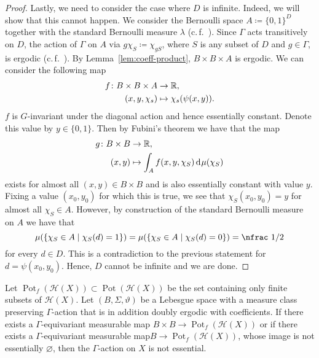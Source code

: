 \begin{proof}
  Lastly, we need to consider the case where \(D\) is infinite. Indeed, we will show that this cannot happen. We consider the Bernoulli space \(A \coloneqq \{0,1\}^D\) together with the standard Bernoulli measure \(\lambda\) (c.\,f.~\cite[29]{Klenke}). Since \(\Gamma\) acts transitively on \(D\), the action of \(\Gamma\) on \(A\) via \(g\chi_S \coloneqq \chi_{gS}\), where \(S\) is any subset of \(D\) and \(g \in \Gamma\), is ergodic (c.\,f.~\cite[Example~20.26]{Klenke}).
  By Lemma~\ref{lem:coeff-product}, \(B \times B \times A\) is ergodic. We can consider the following map
  \begin{align*}
    f\colon B \times B \times A & \to \mathbb{R},\\
    (x,y,\chi_s) & \mapsto \chi_s(\psi(x,y)).
  \end{align*}
  \(f\) is \(G\)-invariant under the diagonal action and hence essentially constant. Denote this value by \(y \in \{0,1\}\). Then by Fubini's theorem we have that the map
  \begin{align*}
    g\colon B \times B & \to \R,\\
    (x,y) & \mapsto \int_A f(x,y,\chi_S) \d\mu(\chi_S)
  \end{align*}
  exists for almost all \((x,y) \in B \times B\) and is also essentially constant with value \(y\). Fixing a value \((x_0, y_0)\) for which this is true, we see that \(\chi_S(x_0,y_0) = y\) for almost all \(\chi_S \in A\). However, by construction of the standard Bernoulli measure on \(A\) we have that
  \[
    \mu(\{\chi_S \in A \mid \chi_S(d) = 1 \}) = \mu(\{\chi_S \in A \mid \chi_S(d) = 0\}) = \text{\nfrac 1/2}
  \]
  for every \(d \in D\). This is a contradiction to the previous statement for \(d = \psi(x_0, y_0)\). Hence, \(D\) cannot be infinite and we are done.
\end{proof}

\begin{cor}[{\cite[Cor. 4.5]{MR3509968}}]
  \label{cor:4.5}
  Let \(\operatorname{Pot}_f(\mathcal{H}(X)) \subset \operatorname{Pot}(\mathcal{H}(X))\) be the set containing only finite subsets of \(\mathcal{H}(X)\). Let \((B, \Sigma, \vartheta)\) be a Lebesgue space with a measure class preserving \(\Gamma\)-action that is in addition doubly ergodic with coefficients. If there exists a \(\Gamma\)-equivariant measurable map \(B \times B \to \operatorname{Pot}_f(\mathcal{H}(X))\) or if there exists a \(\Gamma\)-equivariant measurable map\(B \to \operatorname{Pot}_f(\mathcal{H}(X))\), whose image is not essentially \(\varnothing\), then the \(\Gamma\)-action on \(X\) is not essential.
\end{cor}


